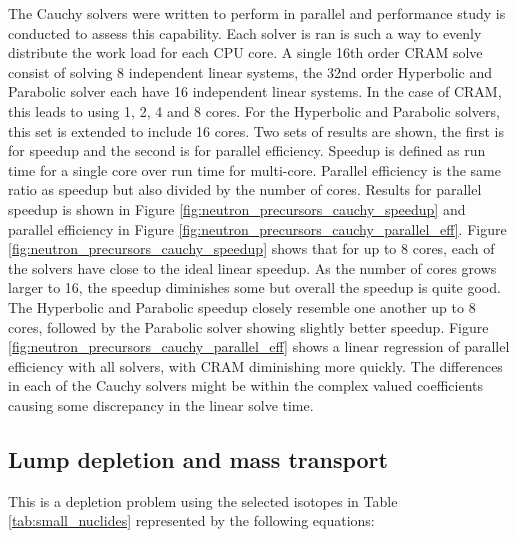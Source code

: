 The Cauchy solvers were written to perform in parallel and performance study is conducted to assess this capability. Each solver is ran is such a way to evenly distribute the work load for each CPU core. A single 16th order CRAM solve consist of solving 8 independent linear systems, the 32nd order Hyperbolic and Parabolic solver each have 16 independent linear systems. In the case of CRAM, this leads to using 1, 2, 4 and 8 cores. For the Hyperbolic and Parabolic solvers, this set is extended to include 16 cores. Two sets of results are shown, the first is for speedup and the second is for parallel efficiency. Speedup is defined as run time for a single core over run time for multi-core. Parallel efficiency is the same ratio as speedup but also divided by the number of cores. Results for parallel speedup is shown in Figure \ref{fig:neutron_precursors_cauchy_speedup} and parallel efficiency in Figure \ref{fig:neutron_precursors_cauchy_parallel_eff}. Figure \ref{fig:neutron_precursors_cauchy_speedup} shows that for up to 8 cores, each of the solvers have close to the ideal linear speedup. As the number of cores grows larger to 16, the speedup diminishes some but overall the speedup is quite good. The Hyperbolic and Parabolic speedup closely resemble one another up to 8 cores, followed by the Parabolic solver showing slightly better speedup. Figure \ref{fig:neutron_precursors_cauchy_parallel_eff} shows a linear regression of parallel efficiency with all solvers, with CRAM diminishing more quickly. The differences in each of the Cauchy solvers might be within the complex valued coefficients causing some discrepancy in the linear solve time. 

\subsection{Lump depletion and mass transport}
This is a depletion problem using the selected isotopes in Table \ref{tab:small_nuclides} represented by the following equations:

\clearpage


